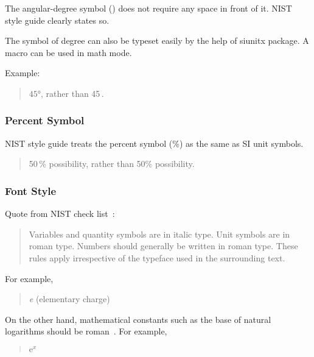 The angular-degree symbol (\textdegree) does not require any space in front
of it.
NIST style guide clearly states so.

The symbol of degree can also be typeset easily by the help of siunitx
package.
A macro \qco{\\ang\{\}} can be used in math mode.

Example:

\begin{quote}
  $\ang{45}$, rather than 45\,\textdegree.
\end{quote}

\subsubsection{Percent Symbol}
\label{sec:app:styleguide:Percent Symbol}

NIST style guide treats the percent symbol (\%) as the same as SI unit
symbols.

\begin{quote}
  50\,\% possibility, rather than 50\% possibility.
\end{quote}

\subsubsection{Font Style}
\label{sec:app:styleguide:Font Style}

Quote from NIST check list~\cite[\#6]{NIST:UnitCheckList}:

\begin{quote}
  Variables and quantity symbols are in italic type.
  Unit symbols are in roman type.
  Numbers should generally be written in roman type.
  These rules apply irrespective of the typeface used in the surrounding
  text.
\end{quote}

For example,
\begin{quote}
  {\textit e} (elementary charge)
\end{quote}

On the other hand, mathematical constants such as the base
of natural logarithms should be roman~\cite{NIST:TypeFaces}.
For example,

\begin{quote}
  $\mathrm{e}^x$
\end{quote}



